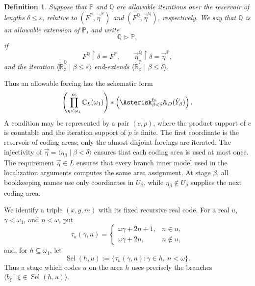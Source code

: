 \documentclass[a4paper,11pt]{article}
\newtheorem{definition}[theorem]{Definition}
\newcommand{\forceP}{\mathbb{P}}
\newcommand{\forceQ}{\mathbb{Q}}
\newcommand{\forceR}{\mathbb{R}}
\begin{document}
\begin{definition}
Suppose that $\forceP$ and $\forceQ$ are allowable iterations over the
reservoir of lengths $\delta\leq\varepsilon$, relative to
$(F^\forceP,\vec\eta^{\forceP})$ and
$(F^\forceQ,\vec\eta^{\forceQ})$, respectively.  We say that $\forceQ$ is an
\emph{allowable extension} of $\forceP$, and write
\[
   \forceQ\triangleright\forceP,
\]
if
\[
   F^\forceQ\upharpoonright\delta=F^\forceP,
   \qquad
   \vec\eta^{\forceQ}\upharpoonright\delta=\vec\eta^{\forceP},
\]
and the iteration
$\langle\dot{\forceR}^{\forceQ}_\beta\mid\beta\leq\varepsilon\rangle$
end-extends
$\langle\dot{\forceR}^{\forceP}_\beta\mid\beta\leq\delta\rangle$.
\end{definition}

Thus an allowable forcing has the schematic form
\[
   \left(\prod_{\eta<\omega_1}^{\mathrm{cs}}
      \mathbb C_L(\omega_1)\right)
   *
   \left(\Asterisk_{\beta<\delta}^{\mathrm{fs}}
      \mathbb A_D(\dot Y_\beta)\right).
\]
A condition may be represented by a pair $(c,\dot p)$, where the product
support of $c$ is countable and the iteration support of $\dot p$ is finite.
The first coordinate is the reservoir of coding areas; only the almost
disjoint forcings are iterated.  The injectivity of
$\vec\eta=\langle\eta_\beta\mid\beta<\delta\rangle$ ensures that each coding
area is used at most once.  The requirement $\vec\eta\in L$ ensures that every
branch inner model used in the localization arguments computes the same area
assignment.  At stage $\beta$, all bookkeeping names use only coordinates in
$U_\beta$, while $\eta_\beta\notin U_\beta$ supplies the next coding area.

We identify a triple $(x,y,m)$ with its fixed recursive real code.  For a real
$u$, $\gamma<\omega_1$, and $n<\omega$, put
\[
   \tau_u(\gamma,n)=
   \begin{cases}
      \omega\gamma+2n+1,& n\in u,\\
      \omega\gamma+2n,& n\notin u,
   \end{cases}
\]
and, for $h\subseteq\omega_1$, let
\[
   \operatorname{Sel}(h,u)
   :=\{\tau_u(\gamma,n):\gamma\in h,\ n<\omega\}.
\]
Thus a stage which codes $u$ on the area $h$ uses precisely the branches
$\langle b_\xi\mid\xi\in\operatorname{Sel}(h,u)\rangle$.
\end{document}
